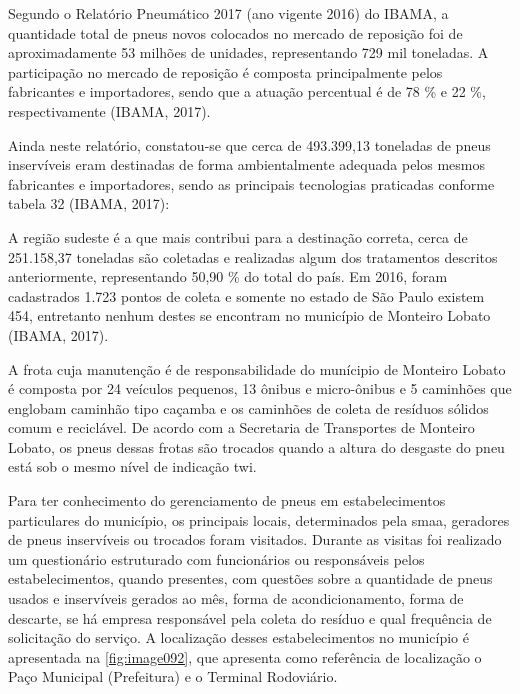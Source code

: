 \begin{description}
		Segundo o Relatório Pneumático 2017 (ano vigente 2016) do IBAMA, a quantidade total de pneus novos colocados no mercado de reposição foi de aproximadamente 53 milhões de unidades, representando 729 mil toneladas. A participação no mercado de reposição é composta principalmente pelos fabricantes e importadores, sendo que a atuação percentual é de 78 \% e 22 \%, respectivamente (IBAMA, 2017).
	
		Ainda neste relatório, constatou-se que cerca de 493.399,13 toneladas de pneus inservíveis eram destinadas de forma ambientalmente adequada pelos mesmos fabricantes e importadores, sendo as principais tecnologias praticadas conforme tabela 32 (IBAMA, 2017):	
	
		
	
		A região sudeste é a que mais contribui para a destinação correta, cerca de 251.158,37 toneladas são coletadas e realizadas algum dos tratamentos descritos anteriormente, representando 50,90 \% do total do país. Em 2016, foram cadastrados 1.723 pontos de coleta e somente no estado de São Paulo existem 454, entretanto nenhum destes se encontram no município de Monteiro Lobato (IBAMA, 2017).

		A frota cuja manutenção é de responsabilidade do munícipio de Monteiro Lobato é composta por 24 veículos pequenos, 13 ônibus e micro-ônibus e 5 caminhões que englobam caminhão tipo caçamba e os caminhões de coleta de resíduos sólidos comum e reciclável. De acordo com a Secretaria de Transportes de Monteiro Lobato, os pneus dessas frotas são trocados quando a altura do desgaste do pneu está sob o mesmo nível de indicação \gls{twi}.
	
		Para ter conhecimento do gerenciamento de pneus em estabelecimentos particulares do município, os principais locais, determinados pela \gls{smaa}, geradores de pneus inservíveis ou trocados foram visitados. Durante as visitas foi realizado um questionário estruturado com funcionários ou responsáveis pelos estabelecimentos, quando presentes, com questões sobre a quantidade de pneus usados e inservíveis gerados ao mês, forma de acondicionamento, forma de descarte, se há empresa responsável pela coleta do resíduo e qual frequência de solicitação do serviço. A localização desses estabelecimentos no município é apresentada na \autoref{fig:image092}, que apresenta como referência de localização o Paço Municipal (Prefeitura) e o Terminal Rodoviário.
	

\end{description}
